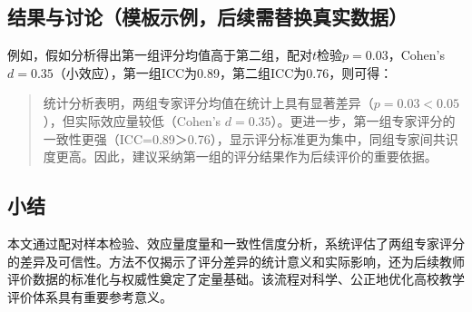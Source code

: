 \subsection{结果与讨论（模板示例，后续需替换真实数据）}
例如，假如分析得出第一组评分均值高于第二组，配对$t$检验$p=0.03$，Cohen's $d=0.35$（小效应），第一组ICC为0.89，第二组ICC为0.76，则可得：
\begin{quote}
统计分析表明，两组专家评分均值在统计上具有显著差异（$p=0.03<0.05$），但实际效应量较低（Cohen's $d=0.35$）。更进一步，第一组专家评分的一致性更强（ICC=0.89＞0.76），显示评分标准更为集中，同组专家间共识度更高。因此，建议采纳第一组的评分结果作为后续评价的重要依据。
\end{quote}

\subsection{小结}
本文通过配对样本检验、效应量度量和一致性信度分析，系统评估了两组专家评分的差异及可信性。方法不仅揭示了评分差异的统计意义和实际影响，还为后续教师评价数据的标准化与权威性奠定了定量基础。该流程对科学、公正地优化高校教学评价体系具有重要参考意义。